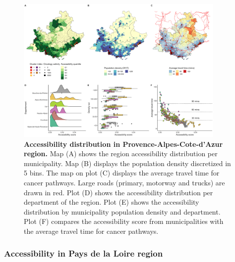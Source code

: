 \begin{figure}[h!]
    \includegraphics[width=0.9\textwidth]{images/camion/fig4_accessibility_Provence-Alpes-Cote-d'Azur.png}
    \centering
    \caption{ \textbf{Accessibility distribution in Provence-Alpes-Cote-d'Azur
            region.} Map (A) shows the region accessibility distribution per
        municipality. Map (B) displays the population density discretized in 5
        bins. The map on plot (C) displays the average travel time for cancer
        pathways. Large roads (primary, motorway and trucks) are drawn in red.
        Plot (D) shows the accessibility distribution per department of the
        region. Plot (E) shows the accessibility distribution by municipality
        population density and department. Plot (F) compares the accessibility
        score from municipalities with the average travel time for cancer
        pathways. }
    \label{fig:accessibility-paca}
\end{figure}

\subsubsection{Accessibility in Pays de la Loire region}

